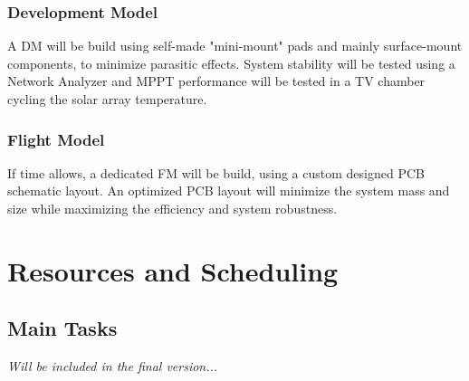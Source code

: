 \subsubsection*{Development Model}
A \ac{DM} will be build using self-made "mini-mount" pads and mainly surface-mount components, to minimize parasitic effects. System stability will be tested using a Network Analyzer and MPPT performance will be tested in a \ac{TV} chamber cycling the solar array temperature.

\subsubsection*{Flight Model}
If time allows, a dedicated \ac{FM} will be build, using a custom designed \ac{PCB} schematic layout. An optimized \ac{PCB} layout will minimize the system mass and size while maximizing the efficiency and system robustness.

\section{Resources and Scheduling}
\label{sec:resources_scheduling}

\subsection{Main Tasks}

\textit{Will be included in the final version...}

